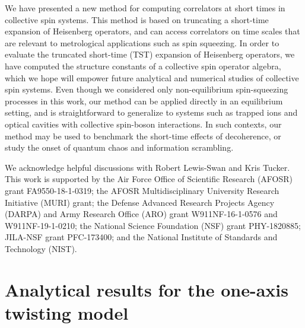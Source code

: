 \documentclass[pra,twocolumn,longbibliography]{revtex4-2}
\newcommand{\1}{\mathds{1}}
\begin{document}
We have presented a new method for computing correlators at short
times in collective spin systems.  This method is based on truncating
a short-time expansion of Heisenberg operators, and can access
correlators on time scales that are relevant to metrological
applications such as spin squeezing.  In order to evaluate the
truncated short-time (TST) expansion of Heisenberg operators, we have
computed the structure constants of a collective spin operator
algebra, which we hope will empower future analytical and numerical
studies of collective spin systems.  Even though we considered only
non-equilibrium spin-squeezing processes in this work, our method can
be applied directly in an equilibrium setting, and is straightforward
to generalize to systems such as trapped ions and optical cavities
with collective spin-boson interactions.  In such contexts, our method
may be used to benchmark the short-time effects of decoherence, or
study the onset of quantum chaos and information scrambling.


\begin{acknowledgments}
  We acknowledge helpful discussions with Robert Lewis-Swan and Kris
  Tucker.  This work is supported by the Air Force Office of
  Scientific Research (AFOSR) grant FA9550-18-1-0319; the AFOSR
  Multidisciplinary University Research Initiative (MURI) grant; the
  Defense Advanced Research Projects Agency (DARPA) and Army Research
  Office (ARO) grant W911NF-16-1-0576 and W911NF-19-1-0210; the
  National Science Foundation (NSF) grant PHY-1820885; JILA-NSF grant
  PFC-173400; and the National Institute of Standards and Technology
  (NIST).
\end{acknowledgments}


\onecolumngrid
\appendix

\section{Analytical results for the one-axis twisting model}
\label{sec:OAT}
\end{document}
